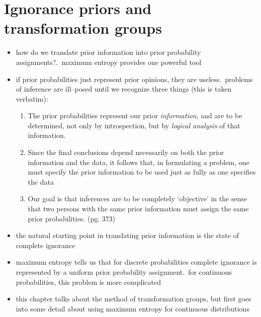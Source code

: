 \documentclass[../jaynes_prob_theory_notes.tex]{subfiles}
\begin{document}
    \section{Ignorance priors and transformation groups}
        \begin{itemize} 
            \item how do we translate prior information into prior probability assignments?.\ maximum entropy provides one powerful tool
            \item if prior probabilities just represent prior opinions, they are useless.\ problems of inference are ill--posed until we recognize three things (this is taken verbatim):
                \begin{enumerate}
                    \item The prior probabilities represent our prior \textit{information}, and are to be determined, not only by introspection, but by \textit{logical analysis} of that information.
                    \item Since the final conclusions depend necessarily on both the prior information and the data, it follows that, in formulating a problem, one must specify the prior information to be used just as fully as one specifies the data
                    \item Our goal is that inferences are to be completely `objective' in the sense that two persons with the same prior information must assign the same prior probabilities. (pg. 373)
                \end{enumerate}
            \item the natural starting point in translating prior information is the state of complete ignorance
            \item maximum entropy tells us that for discrete probabilities complete ignorance is represented by a uniform prior probability assignment.\ for continuous probabilities, this problem is more complicated
            \item this chapter talks about the method of transformation groups, but first goes into some detail about using maximum entropy for continuous distributions
        \end{itemize}
\end{document}
